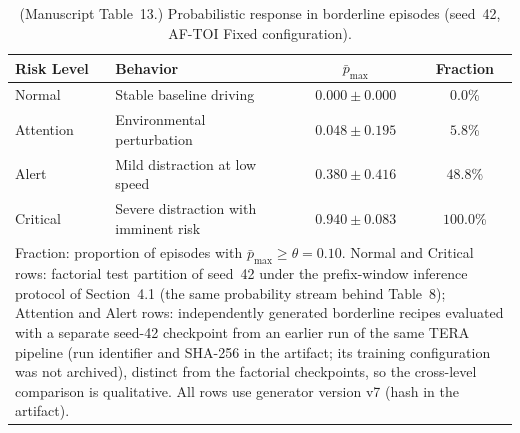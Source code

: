 \documentclass[1p,12pt,authoryear]{elsarticle}
\providecommand{\revcolor}{black}%
\begin{document}
\begin{table}[!tbp]
\centering
\setcounter{table}{12}%
\caption{(Manuscript Table~13.) Probabilistic response in borderline episodes
(seed~42, \mbox{AF-TOI} Fixed configuration).}

\footnotesize
\renewcommand{\arraystretch}{1.22}
\setlength{\tabcolsep}{3pt}
\begin{tabularx}{\columnwidth}{l X c c}
\toprule
\textbf{Risk Level} & \textbf{Behavior}
  & \textbf{$\bar{p}_{\max}$} & \textbf{Fraction} \\
\midrule
Normal    & Stable baseline driving
  & {\color{\revcolor}$0.000 \pm 0.000$} & $0.0$\% \\
\rowcolor{gray!8}
Attention & Environmental perturbation
  & $0.048 \pm 0.195$ & $5.8$\% \\
Alert     & Mild distraction at low speed
  & $0.380 \pm 0.416$ & $48.8$\% \\
\rowcolor{gray!8}
Critical  & Severe distraction with imminent risk
  & {\color{\revcolor}$0.940 \pm 0.083$} & {\color{\revcolor}$100.0$\%} \\
\bottomrule
\multicolumn{4}{p{0.96\columnwidth}}{\scriptsize
Fraction: proportion of episodes with $\bar{p}_{\max} \ge \theta = 0.10$.
{\color{\revcolor}Normal and Critical rows: factorial test partition of
seed~42 under the prefix-window inference protocol of
Section~4.1 (the same probability stream behind
Table~8); Attention and Alert rows:
independently generated borderline recipes evaluated with a separate
seed-42 checkpoint from an earlier run of the same TERA pipeline (run
identifier and SHA-256 in the artifact; its training configuration was
not archived), distinct from the factorial checkpoints, so the
cross-level comparison is qualitative. All rows use generator version
v7 (hash in the artifact).}}
\end{tabularx}
\end{table}
\end{document}
